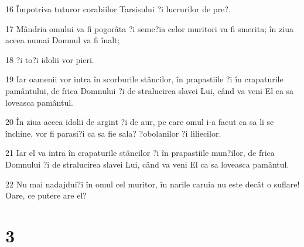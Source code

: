 \par 16 Împotriva tuturor corabiilor Tarsisului ?i lucrurilor de pre?.
\par 17 Mândria omului va fi pogorâta ?i seme?ia celor muritori va fi smerita; în ziua aceea numai Domnul va fi înalt;
\par 18 ?i to?i idolii vor pieri.
\par 19 Iar oamenii vor intra în scorburile stâncilor, în prapastiile ?i în crapaturile pamântului, de frica Domnului ?i de stralucirea slavei Lui, când va veni El ca sa loveasca pamântul.
\par 20 În ziua aceea idolii de argint ?i de aur, pe care omul i-a facut ca sa li se închine, vor fi parasi?i ca sa fie sala? ?obolanilor ?i liliecilor.
\par 21 Iar el va intra în crapaturile stâncilor ?i în prapastiile mun?ilor, de frica Domnului ?i de stralucirea slavei Lui, când va veni El ca sa loveasca pamântul.
\par 22 Nu mai nadajdui?i în omul cel muritor, în narile caruia nu este decât o suflare! Oare, ce putere are el?

\chapter{3}

